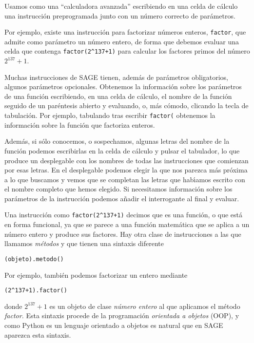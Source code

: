 

Usamos {\sage} como una ``calculadora avanzada'' escribiendo en una celda de
c\'alculo una instrucci\'on preprogramada junto con un n\'umero correcto de
par\'ametros.
 
Por ejemplo, existe una
instrucci\'on para factorizar n\'umeros enteros, \lstinline|factor|, que admite
como
par\'ametro un n\'umero entero,  de forma que debemos evaluar una celda que
contenga 
\lstinline|factor(2^137+1)| para calcular los factores primos del n\'umero
$2^{137}+1$.

Muchas instrucciones de SAGE tienen, adem\'as de par\'ametros obligatorios,
algunos par\'ametros opcionales. Obtenemos la informaci\'on sobre los
par\'ametros de una funci\'on escribiendo, en una celda de cálculo, el nombre de la función seguido de un 
paréntesis abierto y evaluando, o, más cómodo, clicando la tecla de tabulación.
Por ejemplo, tabulando tras escribir \lstinline|factor(| obtenemos la
informaci\'on 
sobre la funci\'on que factoriza enteros. 

Adem\'as, si s\'olo conocemos, o sospechamos,  algunas letras del nombre de la
funci\'on podemos escribirlas en la celda de c\'alculo y pulsar el tabulador, lo
que produce un desplegable con los nombres de todas las instrucciones que
comienzan por esas letras. En el desplegable podemos elegir la que nos parezca
m\'as pr\'oxima a lo que buscamos y vemos que se completan las letras que
hab\'{\i}amos escrito con el nombre completo que hemos elegido. 
Si necesitamos informaci\'on sobre los par\'ametros de la instrucci\'on podemos a\~nadir el
interrogante al final y evaluar.


Una instrucci\'on como \lstinline|factor(2^137+1)| decimos que es una funci\'on,
o
que est\'a en forma funcional, ya que se parece a una funci\'on matem\'atica que
se aplica a un n\'umero entero y produce sus factores.  Hay otra clase de
instrucciones a las que llamamos {\itshape m\'etodos} y que tienen una sintaxis
diferente 
\begin{center}
\verb|(objeto).metodo()|
\end{center}

Por ejemplo, tambi\'en podemos factorizar un entero mediante 
\begin{center}
\lstinline|(2^137+1).factor()|
\end{center}
\noindent donde $2^{137}+1$ es un objeto de clase {\itshape n\'umero entero} al
que
aplicamos el m\'etodo {\itshape factor.} Esta sintaxis procede de la
programaci\'on
{\itshape orientada a objetos} (OOP), y como Python es un lenguaje orientado a
objetos es natural que en SAGE aparezca esta sintaxis. 

